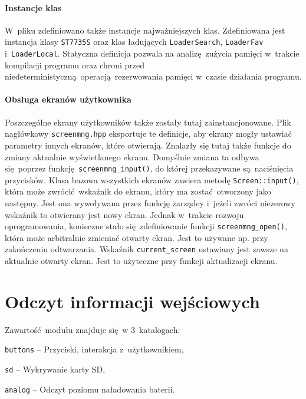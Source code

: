 \documentclass[polish]{aghengthesis}
\let\tempone\itemize
\let\temptwo\enditemize
\renewenvironment{itemize}{\tempone\setlength{\itemsep}{0cm}}{\temptwo}
\begin{document}
			\paragraph{Instancje klas}
				W~pliku zdefiniowano także instancje najważniejszych klas. Zdefiniowana jest instancja klasy \lstinline|ST7735S| oraz klas ładujących \lstinline|LoaderSearch|, \lstinline|LoaderFav| i~\lstinline|LoaderLocal|. Statyczna definicja pozwala na analizę zużycia pamięci w~trakcie kompilacji programu oraz chroni przed niedeterministyczną operacją rezerwowania pamięci w~czasie działania programu.
				
			\paragraph{Obsługa ekranów użytkownika}
				Poszczególne ekrany użytkowników także zostały tutaj zainstancjonowane. Plik nagłówkowy \lstinline|screenmng.hpp| eksportuje te definicje, aby ekrany mogły ustawiać parametry innych ekranów, które otwierają. Znalazły się tutaj także funkcje do zmiany aktualnie wyświetlanego ekranu. Domyślnie zmiana ta odbywa się poprzez funkcję \lstinline|screenmng_input()|, do której przekazywane są naciśnięcia przycisków. Klasa bazowa wszystkich ekranów zawiera metodę \lstinline|Screen::input()|, która może zwrócić wskaźnik do ekranu, który ma zostać otworzony jako następny. Jest ona wywoływana przez funkcję zarządcy i~jeżeli zwróci niezerowy wskaźnik to otwierany jest nowy ekran. Jednak w~trakcie rozwoju oprogramowania, konieczne stało się zdefiniowanie funkcji \lstinline|screenmng_open()|, która może arbitralnie zmieniać otwarty ekran. Jest to używane np. przy zakończeniu odtwarzania. Wskaźnik \lstinline|current_screen| ustawiany jest zawsze na aktualnie otwarty ekran. Jest to użyteczne przy funkcji aktualizacji ekranu.

	\section{Odczyt informacji wejściowych}
		\noindent
		Zawartość modułu znajduje się w 3~katalogach:
		\begin{itemize}
			\item \lstinline|buttons| -- Przyciski, interakcja z~użytkownikiem,
			\item \lstinline|sd| -- Wykrywanie karty SD,
			\item \lstinline|analog| -- Odczyt poziomu naładowania baterii.
		\end{itemize}
		
\end{document}
